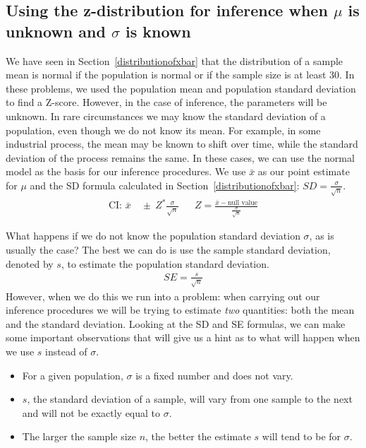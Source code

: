 \subsection{Using the z-distribution for inference when $\mu$ is unknown and $\sigma$ is known}
\label{nearlyNormalPopWithKnownSD}

We have seen in Section~\ref{distributionofxbar} that the distribution of a sample mean is normal if the population is normal or if the sample size is at least 30. In these problems, we used the population mean and population standard deviation to find a Z-score. However, in the case of inference, the parameters will be unknown. In rare circumstances we may know the standard deviation of a population, even though we do not know its mean. For example, in some industrial process, the mean may be known to shift over time, while the standard deviation of the process remains the same. In these cases, we can use the normal model as the basis for our inference procedures. We use $\bar{x}$ as our point estimate for $\mu$ and the SD formula calculated in Section~\ref{distributionofxbar}: $SD =\frac{\sigma}{\sqrt{n}}$.
\begin{align*}
\text{CI:  } \bar{x} &\ \pm \ Z^*\frac{\sigma}{\sqrt{n}}
&&Z = \frac{\bar{x} - \text{null value}}{\frac{\sigma}{\sqrt{n}}}
\end{align*}

What happens if we do not know the population standard deviation $\sigma$, as is usually the case?  The best we can do is use the sample standard deviation, denoted by $s$, to estimate the population standard deviation.
\begin{align*}
SE= \frac{s}{\sqrt{n}}
\end{align*}
However, when we do this we run into a problem:  when carrying out our inference procedures we will be trying to estimate \emph{two} quantities: both the mean and the standard deviation. Looking at the SD and SE formulas, we can make some important observations that will give us a hint as to what will happen when we use $s$ instead of $\sigma$.
\begin{itemize}
\setlength{\itemsep}{0mm}
\item For a given population, $\sigma$ is a fixed number and does not vary.
\item $s$, the standard deviation of a sample, will vary from one sample to the next and will not be exactly equal to $\sigma$.
\item The larger the sample size $n$, the better the estimate $s$ will tend to be for $\sigma$.
\end{itemize}

